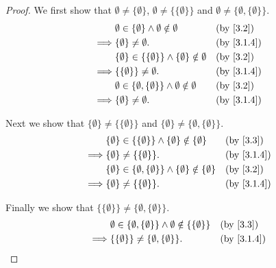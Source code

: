 \begin{proof}
  We first show that \(\emptyset \neq \{\emptyset\}\), \(\emptyset \neq \{\{\emptyset\}\}\) and \(\emptyset \neq \{\emptyset, \{\emptyset\}\}\).
  \begin{align*}
             & \emptyset \in \{\emptyset\} \land \emptyset \notin \emptyset                &  & \text{(by \cref{3.2})} \\
    \implies & \{\emptyset\} \neq \emptyset.                                               &  & \by{3.1.4}             \\
             & \{\emptyset\} \in \{\{\emptyset\}\} \land \{\emptyset\} \notin \emptyset    &  & \text{(by \cref{3.2})} \\
    \implies & \{\{\emptyset\}\} \neq \emptyset.                                           &  & \by{3.1.4}             \\
             & \emptyset \in \{\emptyset, \{\emptyset\}\} \land \emptyset \notin \emptyset &  & \text{(by \cref{3.2})} \\
    \implies & \{\emptyset\} \neq \emptyset.                                               &  & \by{3.1.4}
  \end{align*}

  Next we show that \(\{\emptyset\} \neq \{\{\emptyset\}\}\) and \(\{\emptyset\} \neq \{\emptyset, \{\emptyset\}\}\).
  \begin{align*}
             & \{\emptyset\} \in \{\{\emptyset\}\} \land \{\emptyset\} \notin \{\emptyset\}            &  & \text{(by \cref{3.3})} \\
    \implies & \{\emptyset\} \neq \{\{\emptyset\}\}.                                                   &  & \by{3.1.4}             \\
             & \{\emptyset\} \in \{\emptyset, \{\emptyset\}\} \land \{\emptyset\} \notin \{\emptyset\} &  & \text{(by \cref{3.2})} \\
    \implies & \{\emptyset\} \neq \{\{\emptyset\}\}.                                                   &  & \by{3.1.4}
  \end{align*}

  Finally we show that \(\{\{\emptyset\}\} \neq \{\emptyset, \{\emptyset\}\}\).
  \begin{align*}
             & \emptyset \in \{\emptyset, \{\emptyset\}\} \land \emptyset \notin \{\{\emptyset\}\} &  & \text{(by \cref{3.3})} \\
    \implies & \{\{\emptyset\}\} \neq \{\emptyset, \{\emptyset\}\}.                                &  & \by{3.1.4}
  \end{align*}
\end{proof}

